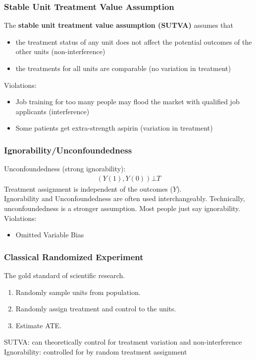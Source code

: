 \documentclass{beamer}
\begin{document}
\begin{frame}
\frametitle{Stable Unit Treatment Value Assumption}
\pause
The {\bf stable unit treatment value assumption (SUTVA)} assumes that
\pause
\begin{itemize}
\item the treatment status of any unit does not affect the potential
outcomes of the other units (non-interference)
\pause
\item the treatments for all units are comparable (no variation in treatment) 
\end{itemize}
\bigskip
\pause
Violations: 
\pause
\begin{itemize}
\item Job training for too many people may flood the market with
qualified job applicants (interference) 
\pause
\item Some patients get extra-strength aspirin (variation in treatment)
\end{itemize}
\end{frame}

\begin{frame}
\frametitle{Ignorability/Unconfoundedness}
Unconfoundedness (strong ignorability): 
\begin{eqnarray*}
(Y(1), Y(0)) \bot T
\end{eqnarray*}
\pause
\bigskip
Treatment assignment is independent of the outcomes ($Y$). \\
\pause
\bigskip
Ignorability and Unconfoundedness are often used interchangeably. 
Technically, unconfoundedness is a stronger assumption.  Most people
just say ignorability.\\
\bigskip
\pause
Violations:
\pause
\begin{itemize}
\item Omitted Variable Bias
\end{itemize}
\end{frame}

\begin{frame}
\frametitle{Classical Randomized Experiment}
\pause
The gold standard of scientific research.\\
\pause
\bigskip
\begin{enumerate}
\item Randomly sample units from population.\\
\pause
\item Randomly assign treatment and control to the units.\\
\pause
\item Estimate ATE.
\end{enumerate}
\pause
\bigskip
SUTVA: can theoretically control for treatment variation and
non-interference \\
\pause
\bigskip
Ignorability: controlled for by random treatment assignment
\end{frame}
\end{document}
